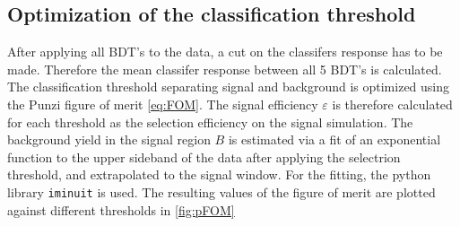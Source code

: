 \subsection{Optimization of the classification threshold}
After applying all BDT's to the data, a cut on the classifers response has to be made. Therefore the mean classifer response between all 5 BDT's is calculated.
The classification threshold separating signal and background is optimized using the Punzi figure of merit \autoref{eq:FOM}.
The signal efficiency $\varepsilon$ is therefore calculated for each threshold as the selection efficiency on the signal simulation. The background yield in the signal region $B$
is estimated via a fit of an exponential function to the upper sideband of the data after applying the selectrion threshold, and extrapolated to the signal window.
For the fitting, the python library \texttt{iminuit} \cite{iminuit} is used.
The resulting values of the figure of merit are plotted against different thresholds in \autoref{fig:pFOM}
